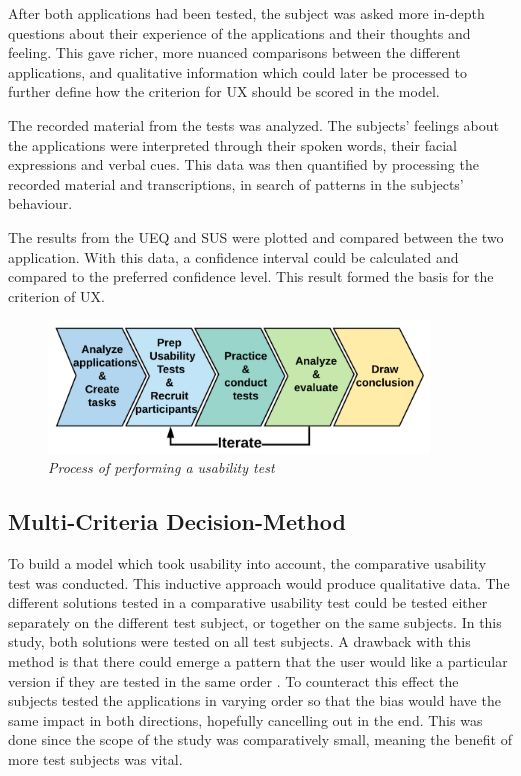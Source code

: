 After both applications had been tested, the subject was asked more in-depth questions about their experience of the applications and their thoughts and feeling. This gave richer, more nuanced comparisons between the different applications, and qualitative information which could later be processed to further define how the criterion for UX should be scored in the model.

The recorded material from the tests was analyzed. The subjects’ feelings about the applications were interpreted through their spoken words, their facial expressions and verbal cues. This data was then quantified by processing the recorded material and transcriptions, in search of patterns in the subjects’ behaviour.

The results from the UEQ and SUS were plotted and compared between the two application. With this data, a confidence interval could be calculated and compared to the preferred confidence level. This result formed the basis for the criterion of UX.

\begin{figure}[ht]
    \centering 
    \includegraphics[width=0.9\textwidth]{img/usability_test_process.png}
    \hfill
    \caption{\textit{Process of performing a usability test}}
    \label{fig:usability_test_process}
\end{figure}

\subsection{Multi-Criteria Decision-Method}

To build a model which took usability into account, the comparative usability test was conducted. This inductive approach would produce qualitative data. The different solutions tested in a comparative usability test could be tested either separately on the different test subject, or together on the same subjects. In this study, both solutions were tested on all test subjects. A drawback with this method is that there could emerge a pattern that the user would like a particular version if they are tested in the same order \cite{Ross2017}. To counteract this effect the subjects tested the applications in varying order so that the bias would have the same impact in both directions, hopefully cancelling out in the end. This was done since the scope of the study was comparatively small, meaning the benefit of more test subjects was vital.

